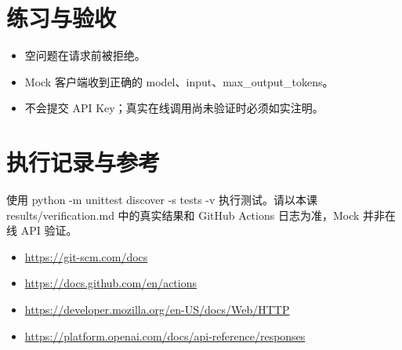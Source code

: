 \documentclass[UTF8,11pt,a4paper]{ctexart}
\begin{document}
\section{练习与验收}
\begin{itemize}
\item 空问题在请求前被拒绝。
\item Mock 客户端收到正确的 model、input、max\_output\_tokens。
\item 不会提交 API Key；真实在线调用尚未验证时必须如实注明。
\end{itemize}
\section{执行记录与参考}
使用 python -m unittest discover -s tests -v 执行测试。请以本课 results/verification.md 中的真实结果和 GitHub Actions 日志为准，Mock 并非在线 API 验证。
\begin{itemize}
\item \url{https://git-scm.com/docs}
\item \url{https://docs.github.com/en/actions}
\item \url{https://developer.mozilla.org/en-US/docs/Web/HTTP}
\item \url{https://platform.openai.com/docs/api-reference/responses}
\end{itemize}
\end{document}
